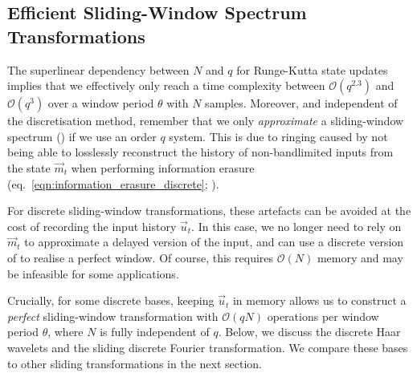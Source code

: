 %


\subsection{Efficient Sliding-Window Spectrum Transformations}
\label{sec:efficient_sliding_window}

The superlinear dependency between $N$ and $q$ for Runge-Kutta state updates implies that we effectively only reach a time complexity between $\mathcal{O}(q^{2.3})$ and $\mathcal{O}(q^3)$ over a window period $\theta$ with $N$ samples.
Moreover, and independent of the discretisation method, remember that we only \emph{approximate} a sliding-window spectrum () if we use an order $q$ \LTI system.
This is due to ringing caused by not being able to losslessly reconstruct the history of non-bandlimited inputs from the state $\vec m_t$ when performing information erasure (eq.~\ref{eqn:information_erasure_discrete}; ).

For discrete sliding-window transformations, these artefacts can be avoided at the cost of recording the input history $\vec u_t$.
In this case, we no longer need to rely on $\vec m_t$ to approximate a delayed version of the input, and can use a discrete version of  to realise a perfect window.
Of course, this requires $\mathcal{O}(N)$ memory and may be infeasible for some applications.

Crucially, for some discrete bases, keeping $\vec u_t$ in memory allows us to construct a \emph{perfect} sliding-window transformation with $\mathcal{O}(qN)$ operations per window period $\theta$, where $N$ is fully independent of $q$.
Below, we discuss the discrete Haar wavelets and the sliding discrete Fourier transformation.
We compare these bases to other sliding transformations in the next section.

